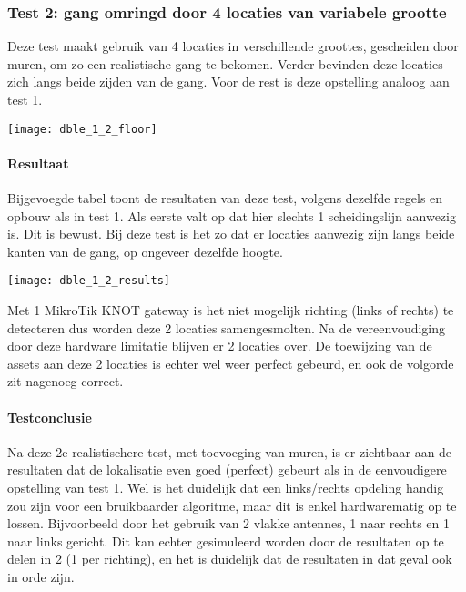 \subsubsection{Test 2: gang omringd door 4 locaties van variabele grootte}
\begin{minipage}{0.55\textwidth}
Deze test maakt gebruik van 4 locaties in verschillende groottes, gescheiden door muren, om zo een realistische gang te bekomen. Verder bevinden deze locaties zich langs beide zijden van de gang. Voor de rest is deze opstelling analoog aan test 1.
\end{minipage}
\hfill
\begin{minipage}{0.42\textwidth}
	\texttt{[image: dble\_1\_2\_floor]}
	\label{fig:ond-ble-dynamic-1-2-ops}
\end{minipage}

\paragraph{Resultaat}
\begin{minipage}{0.42\textwidth}
Bijgevoegde tabel toont de resultaten van deze test, volgens dezelfde regels en opbouw als in test 1. Als eerste valt op dat hier slechts 1 scheidingslijn aanwezig is. Dit is bewust. Bij deze test is het zo dat er locaties aanwezig zijn langs beide kanten van de gang, op ongeveer dezelfde hoogte. 
\end{minipage}
\hfill
\begin{minipage}{0.55\textwidth}
	\texttt{[image: dble\_1\_2\_results]}
	\label{fig:ond-ble-dynamic-1-2-res}
\end{minipage}

Met 1 MikroTik KNOT gateway is het niet mogelijk richting (links of rechts) te detecteren dus worden deze 2 locaties samengesmolten. Na de vereenvoudiging door deze hardware limitatie blijven er 2 locaties over. De toewijzing van de assets aan deze 2 locaties is echter wel weer perfect gebeurd, en ook de volgorde zit nagenoeg correct.

\paragraph{Testconclusie}
Na deze 2e realistischere test, met toevoeging van muren, is er zichtbaar aan de resultaten dat de lokalisatie even goed (perfect) gebeurt als in de eenvoudigere opstelling van test 1. Wel is het duidelijk dat een links/rechts opdeling handig zou zijn voor een bruikbaarder algoritme, maar dit is enkel hardwarematig op te lossen. Bijvoorbeeld door het gebruik van 2 vlakke antennes, 1 naar rechts en 1 naar links gericht. Dit kan echter gesimuleerd worden door de resultaten op te delen in 2 (1 per richting), en het is duidelijk dat de resultaten in dat geval ook in orde zijn.


